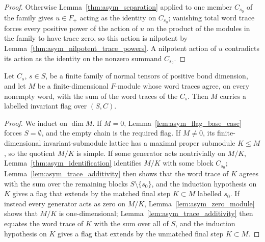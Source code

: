 \begin{proof}
    \leanok
    Otherwise Lemma~\ref{thm:asym_separation} applied to one member $C_{s_0}$
    of the family gives $u\in F_+$ acting as the identity on $C_{s_0}$;
    vanishing total word trace forces every positive power of the action of
    $u$ on the product of the modules in the family to have trace zero, so
    this action is nilpotent by Lemma~\ref{thm:asym_nilpotent_trace_powers}.
    A nilpotent action of $u$ contradicts its action as the identity on the
    nonzero summand $C_{s_0}$.
\end{proof}

\begin{lemma}
    \label{thm:asym_flag_theorem}
    \leanok
    Let $C_s$, $s\in S$, be a finite family of normal tensors of positive
    bond dimension, and let $M$ be a finite-dimensional $F$-module whose
    word traces agree, on every nonempty word, with the sum of the word
    traces of the $C_s$. Then $M$ carries a labelled invariant flag over
    $(S,C)$.
\end{lemma}

\begin{proof}
    \leanok
    We induct on $\dim M$. If $M=0$, Lemma~\ref{lem:asym_flag_base_case}
    forces $S=\emptyset$, and the empty chain is the required flag. If
    $M\neq0$, its finite-dimensional invariant-submodule lattice has a
    maximal proper submodule $K\leq M$, so the quotient $M/K$ is simple. If
    some generator acts nontrivially on $M/K$,
    Lemma~\ref{thm:asym_identification} identifies $M/K$ with some block
    $C_{s_0}$; Lemma~\ref{lem:asym_trace_additivity} then shows that the word
    trace of $K$ agrees with the sum over the remaining blocks
    $S\setminus\{s_0\}$, and the induction hypothesis on $K$ gives a flag
    that extends by the matched final step $K\subset M$ labelled $s_0$. If
    instead every generator acts as zero on $M/K$,
    Lemma~\ref{lem:asym_zero_module} shows that $M/K$ is one-dimensional;
    Lemma~\ref{lem:asym_trace_additivity} then equates the word trace of $K$
    with the sum over all of $S$, and the induction hypothesis on $K$ gives a
    flag that extends by the unmatched final step $K\subset M$.
\end{proof}


